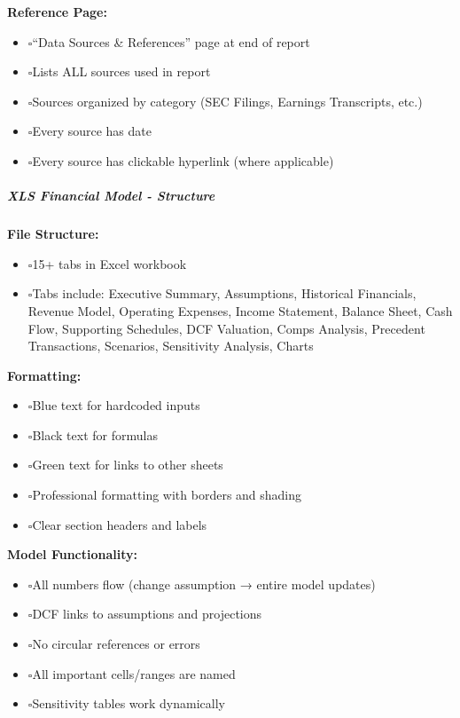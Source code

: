 \documentclass[11pt]{article}
\newcommand{\UncheckedBox}{$\square$}
\begin{document}
\textbf{Reference Page:}

\begin{itemize}[leftmargin=*,itemsep=2pt,topsep=2pt]
\item {} \UncheckedBox ``Data Sources \& References'' page at end of report
\item {} \UncheckedBox Lists ALL sources used in report
\item {} \UncheckedBox Sources organized by category (SEC Filings, Earnings Transcripts, etc.)
\item {} \UncheckedBox Every source has date
\item {} \UncheckedBox Every source has clickable hyperlink (where applicable)
\end{itemize}

\subparagraph{XLS Financial Model - Structure}\mbox{}\par

\textbf{File Structure:}

\begin{itemize}[leftmargin=*,itemsep=2pt,topsep=2pt]
\item {} \UncheckedBox 15+ tabs in Excel workbook
\item {} \UncheckedBox Tabs include: Executive Summary, Assumptions, Historical Financials, Revenue Model, Operating Expenses, Income Statement, Balance Sheet, Cash Flow, Supporting Schedules, DCF Valuation, Comps Analysis, Precedent Transactions, Scenarios, Sensitivity Analysis, Charts
\end{itemize}

\textbf{Formatting:}

\begin{itemize}[leftmargin=*,itemsep=2pt,topsep=2pt]
\item {} \UncheckedBox Blue text for hardcoded inputs
\item {} \UncheckedBox Black text for formulas
\item {} \UncheckedBox Green text for links to other sheets
\item {} \UncheckedBox Professional formatting with borders and shading
\item {} \UncheckedBox Clear section headers and labels
\end{itemize}

\textbf{Model Functionality:}

\begin{itemize}[leftmargin=*,itemsep=2pt,topsep=2pt]
\item {} \UncheckedBox All numbers flow (change assumption → entire model updates)
\item {} \UncheckedBox DCF links to assumptions and projections
\item {} \UncheckedBox No circular references or errors
\item {} \UncheckedBox All important cells/ranges are named
\item {} \UncheckedBox Sensitivity tables work dynamically
\end{itemize}
\end{document}
